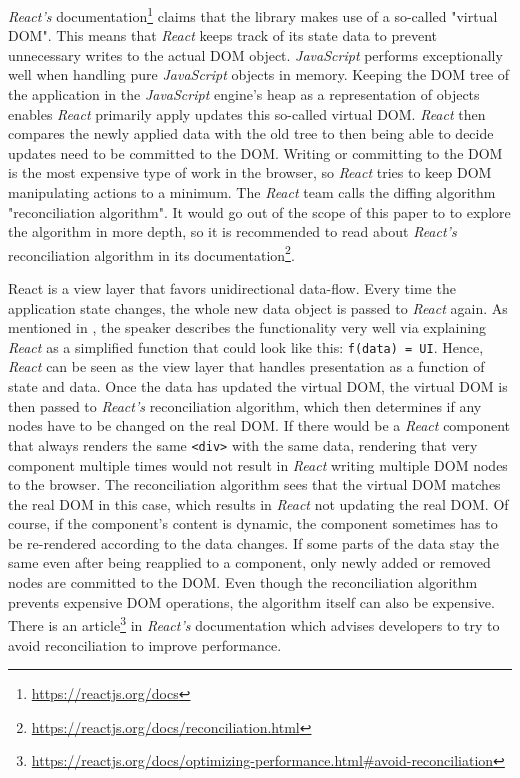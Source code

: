 \emph{React's} documentation\footnote{\url{https://reactjs.org/docs}} claims that the library makes use of a so-called "virtual DOM". This means that \emph{React} keeps track of its state data to prevent unnecessary writes to the actual DOM object. \emph{JavaScript} performs exceptionally well when handling pure \emph{JavaScript} objects in memory. Keeping the DOM tree of the application in the \emph{JavaScript} engine's heap as a representation of objects enables \emph{React} primarily apply updates this so-called virtual DOM. \emph{React} then compares the newly applied data with the old tree to then being able to decide updates need to be committed to the DOM. Writing or committing to the DOM is the most expensive type of work in the browser, so \emph{React} tries to keep DOM manipulating actions to a minimum. The \emph{React} team calls the diffing algorithm "reconciliation algorithm". It would go out of the scope of this paper to to explore the algorithm in more depth, so it is recommended to read about \emph{React's} reconciliation algorithm in its documentation\footnote{\url{https://reactjs.org/docs/reconciliation.html}}.

React is a view layer that favors unidirectional data-flow. Every time the application state changes, the whole new data object is passed to \emph{React} again. As mentioned in \cite[6:50]{ReactFoundingVideo}, the speaker describes the functionality very well via explaining \emph{React} as a simplified function that could look like this: \texttt{f(data) = UI}. Hence, \emph{React} can be seen as the view layer that handles presentation as a function of state and data. Once the data has updated the virtual DOM, the virtual DOM is then passed to \emph{React's} reconciliation algorithm, which then determines if any nodes have to be changed on the real DOM. If there would be a \emph{React} component that always renders the same \texttt{<div>} with the same data, rendering that very component multiple times would not result in \emph{React} writing multiple DOM nodes to the browser. The reconciliation algorithm sees that the virtual DOM matches the real DOM in this case, which results in \emph{React} not updating the real DOM. Of course, if the component's content is dynamic, the component sometimes has to be re-rendered according to the data changes. If some parts of the data stay the same even after being reapplied to a component, only newly added or removed nodes are committed to the DOM. Even though the reconciliation algorithm prevents expensive DOM operations, the algorithm itself can also be expensive. There is an article\footnote{\url{https://reactjs.org/docs/optimizing-performance.html\#avoid-reconciliation}} in \emph{React's} documentation which advises developers to try to avoid reconciliation to improve performance.

